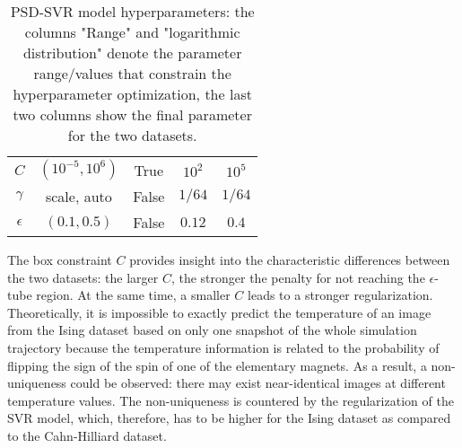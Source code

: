 \documentclass[11pt, authoryear]{elsarticle}
\begin{document}
\begin{appendix}
\begin{table}
\begin{tabular}{ c{30mm}|c{25mm}c{25mm}|c{20mm} c{20mm}  }
				$C$            & $(10^{-5}, 10^6)$  & True        & $10^2$ & $10^5$ \\  	
				$\gamma$       & scale, auto        & False       & $1/64$ & $1/64$ \\
				$\epsilon$     & $(0.1, 0.5)$       & False       & $0.12$ & $0.4$ \\
				\hline\hline
			\end{tabular}
			\caption{
				PSD-SVR model hyperparameters: the columns "Range" and "logarithmic 
				distribution" denote the parameter range/values that constrain the 
				hyperparameter optimization, the last two columns show the final 
				parameter for the two datasets.
			}
			\label{tab:PSD_SVR_hyperparameters}
		\end{table}
		The box constraint $C$ provides insight into the characteristic differences 
		between the two datasets: the larger $C$, the stronger the penalty for not reaching the $\epsilon$-tube region. At the same time, a smaller $C$ leads to a stronger regularization. Theoretically, it is impossible to exactly predict 
		the temperature of an image from the Ising dataset based on only one snapshot
		of the whole simulation trajectory because the temperature information is 
		related to the probability of flipping the sign of the spin of one of the
		elementary magnets. As a result, a non-uniqueness could be observed: there may exist
		near-identical images at different temperature values. The non-uniqueness is countered by 
		the regularization of the SVR model, which, therefore, has to be higher 
		for the Ising dataset as compared to the Cahn-Hilliard dataset.
		
		
		
		
		

\end{appendix}
\end{document}
